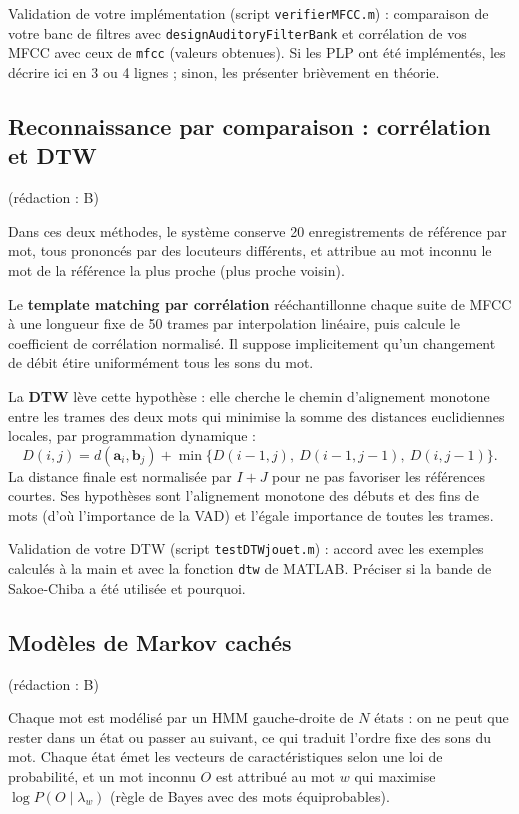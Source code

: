 \documentclass[11pt,a4paper]{article}
\newcommand{\redaction}[1]{\hfill{\small\color{gray}(rédaction : #1)}}   %
\begin{document}
\begin{aremplir}
Validation de votre implémentation (script \texttt{verifierMFCC.m}) : comparaison de votre banc de filtres avec \texttt{designAuditoryFilterBank} et corrélation de vos MFCC avec ceux de \texttt{mfcc} (valeurs obtenues). Si les PLP ont été implémentés, les décrire ici en 3 ou 4 lignes ; sinon, les présenter brièvement en théorie.
\end{aremplir}

\subsection{Reconnaissance par comparaison : corrélation et DTW}\redaction{B}

Dans ces deux méthodes, le système conserve 20 enregistrements de référence par mot, tous prononcés par des locuteurs différents, et attribue au mot inconnu le mot de la référence la plus proche (plus proche voisin).

Le \textbf{template matching par corrélation} rééchantillonne chaque suite de MFCC à une longueur fixe de 50 trames par interpolation linéaire, puis calcule le coefficient de corrélation normalisé. Il suppose implicitement qu'un changement de débit étire uniformément tous les sons du mot.

La \textbf{DTW} lève cette hypothèse : elle cherche le chemin d'alignement monotone entre les trames des deux mots qui minimise la somme des distances euclidiennes locales, par programmation dynamique :
\[
D(i, j) = d(\mathbf{a}_i, \mathbf{b}_j) + \min\{D(i-1, j),\ D(i-1, j-1),\ D(i, j-1)\}.
\]
La distance finale est normalisée par $I + J$ pour ne pas favoriser les références courtes. Ses hypothèses sont l'alignement monotone des débuts et des fins de mots (d'où l'importance de la VAD) et l'égale importance de toutes les trames.

\begin{aremplir}
Validation de votre DTW (script \texttt{testDTWjouet.m}) : accord avec les exemples calculés à la main et avec la fonction \texttt{dtw} de MATLAB. Préciser si la bande de Sakoe-Chiba a été utilisée et pourquoi.
\end{aremplir}

\subsection{Modèles de Markov cachés}\redaction{B}

Chaque mot est modélisé par un HMM gauche-droite de $N$ états : on ne peut que rester dans un état ou passer au suivant, ce qui traduit l'ordre fixe des sons du mot. Chaque état émet les vecteurs de caractéristiques selon une loi de probabilité, et un mot inconnu $O$ est attribué au mot $w$ qui maximise $\log P(O \mid \lambda_w)$ (règle de Bayes avec des mots équiprobables).
\end{document}
